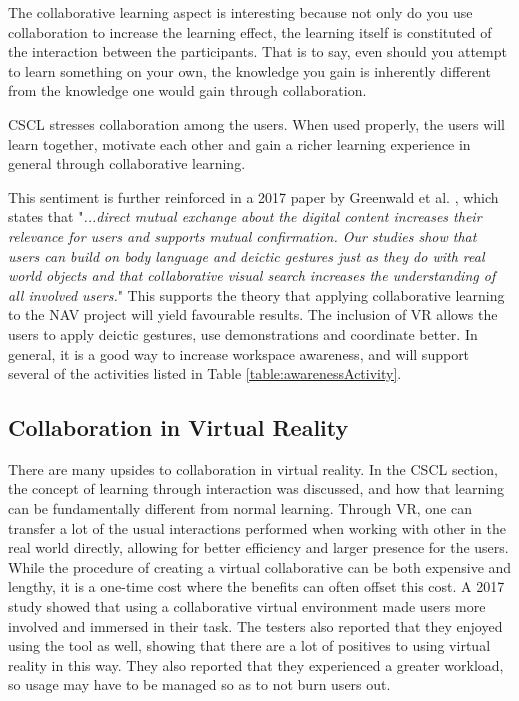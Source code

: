 The collaborative learning aspect is interesting because not only do you use collaboration to increase the learning effect, the learning itself is constituted of the interaction between the participants\cite{stahl2006computer}. That is to say, even should you attempt to learn something on your own, the knowledge you gain is inherently different from the knowledge one would gain through collaboration.


CSCL stresses collaboration among the users. When used properly, the users will learn together, motivate each other and gain a richer learning experience in general through collaborative learning.

This sentiment is further reinforced in a 2017 paper by Greenwald et al. \cite{greenwald2017technology}, which states that "\textit{...direct mutual exchange about the digital content increases their relevance for users and supports mutual confirmation. Our studies show that users can build on body language and deictic gestures just as they do with real world objects and that collaborative visual search increases the understanding of all involved users.}" This supports the theory that applying collaborative learning to the NAV project will yield favourable results. The inclusion of VR allows the users to apply deictic gestures, use demonstrations and coordinate better. In general, it is a good way to increase workspace awareness, and will support several of the activities listed in Table \ref{table:awarenessActivity}.

\subsection{Collaboration in Virtual Reality}
There are many upsides to collaboration in virtual reality. In the CSCL section, the concept of learning through interaction was discussed, and how that learning can be fundamentally different from normal learning. Through VR, one can transfer a lot of the usual interactions performed when working with other in the real world directly, allowing for better efficiency and larger presence for the users\cite{greenwald2017technology}. While the procedure of creating a virtual collaborative can be both expensive and lengthy, it is a one-time cost where the benefits can often offset this cost.  A 2017 study showed that using a collaborative virtual environment made users more involved and immersed in their task. The testers also reported that they enjoyed using the tool as well, showing that there are a lot of positives to using virtual reality in this way. They also reported that they experienced a greater workload, so usage may have to be managed so as to not burn users out\cite{madathil2017investigation}.

